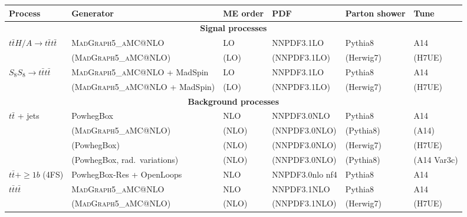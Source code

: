 \begin{table}[htbp]
\centering
\footnotesize
\setlength{\tabcolsep}{3pt}
\renewcommand{\arraystretch}{1.15}

\begin{tabular}{
p{2.0cm}
p{4.6cm}
p{1.9cm}
p{2.4cm}
p{1.9cm}
p{1.2cm}
}

\toprule
Process & Generator & ME order & PDF & Parton shower & Tune \\
\midrule

\multicolumn{6}{c}{\textbf{Signal processes}} \\
\midrule

$t\bar t H/A \rightarrow t\bar t t\bar t$
& \textsc{MadGraph5\_aMC@NLO}
& LO
& NNPDF3.1LO
& Pythia8
& A14 \\

& (\textsc{MadGraph5\_aMC@NLO})
& (LO)
& (NNPDF3.1LO)
& (Herwig7)
& (H7UE) \\

$S_8S_8 \rightarrow t\bar t t\bar t$
& \textsc{MadGraph5\_aMC@NLO} + MadSpin
& LO
& NNPDF3.1LO
& Pythia8
& A14 \\

& (\textsc{MadGraph5\_aMC@NLO} + MadSpin)
& (LO)
& (NNPDF3.1LO)
& (Herwig7)
& (H7UE) \\

\midrule
\multicolumn{6}{c}{\textbf{Background processes}} \\
\midrule

\multirow{4}{*}{$t\bar t$ + jets}

& PowhegBox
& NLO
& NNPDF3.0NLO
& Pythia8
& A14 \\

& (\textsc{MadGraph5\_aMC@NLO})
& (NLO)
& (NNPDF3.0NLO)
& (Pythia8)
& (A14) \\

& (PowhegBox)
& (NLO)
& (NNPDF3.0NLO)
& (Herwig7)
& (H7UE) \\

& (PowhegBox, rad.\ variations)
& (NLO)
& (NNPDF3.0NLO)
& (Pythia8)
& (A14 Var3c) \\

$t\bar t +\geq 1b$ (4FS)
& PowhegBox-Res + OpenLoops
& NLO
& NNPDF3.0nlo nf4
& Pythia8
& A14 \\

\multirow{2}{*}{$t\bar t t\bar t$}

& \textsc{MadGraph5\_aMC@NLO}
& NLO
& NNPDF3.1NLO
& Pythia8
& A14 \\

& (\textsc{MadGraph5\_aMC@NLO})
& (NLO)
& (NNPDF3.1NLO)
& (Herwig7)
& (H7UE) \\


\end{tabular}
\end{table}
